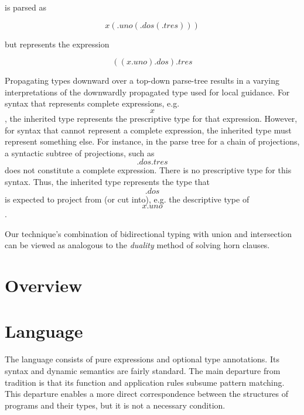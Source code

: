 \documentclass[sigplan,screen,review]{acmart}
\begin{document}
\noindent is parsed as

\[ 
x(.uno(.dos(.tres)))
\]

\noindent but represents the expression 

\[ 
((x.uno).dos).tres
\]

Propagating types downward over a top-down parse-tree results in a varying interpretations of the downwardly propagated type used for local guidance.
For syntax that represents complete expressions, e.g. \[ x \], the inherited type represents the prescriptive type for that expression.
However, for syntax that cannot represent a complete expression, the inherited type must represent something else. 
For instance, in the parse tree for a chain of projections, a syntactic subtree of projections, such as \[ .dos.tres \] does not constitute a complete expression.   
There is no prescriptive type for this syntax. Thus, the inherited type represents the type that \[ .dos \] is expected to project from (or cut into), 
e.g. the descriptive type of \[ x.uno \].


Our technique's combination of bidirectional typing with union and intersection can be viewed as analogous to the \textit{duality} method
of solving horn clauses.


\section{Overview}



\section{Language}
The language consists of pure expressions and optional type annotations. 
Its syntax and dynamic semantics 
are fairly standard. The main departure from tradition is that its function
and application rules subsume pattern matching. This departure enables a more direct  
correspondence between the structures of programs and their types, but it is 
not a necessary condition.
\end{document}
